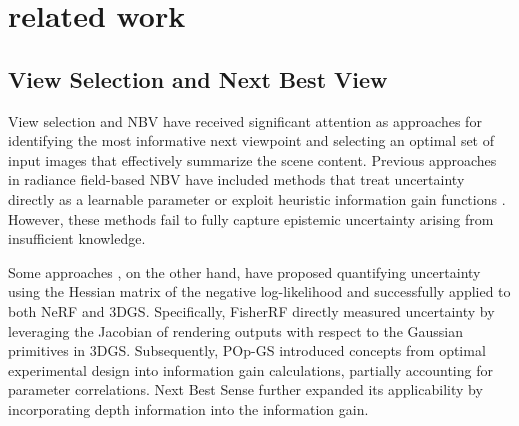 \section{related work}
\label{sec:relatedwork}
\subsection{View Selection and Next Best View}

View selection and \ac{NBV} have received significant attention as approaches for identifying the most informative next viewpoint and selecting an optimal set of input images that effectively summarize the scene content. Previous approaches in radiance field-based \ac{NBV} have included methods that treat uncertainty directly as a learnable parameter \cite{feng2024naruto} or exploit heuristic information gain functions \cite{chen2025activegamer}. However, these methods fail to fully capture epistemic uncertainty arising from insufficient knowledge. 

Some approaches \cite{goli2024bayes, jiang2024fisherrf, wilson2025pop, strong2024next}, on the other hand, have proposed quantifying uncertainty using the Hessian matrix of the negative log-likelihood and successfully applied to both \ac{NeRF} and \ac{3DGS}. Specifically, FisherRF \cite{jiang2024fisherrf} directly measured uncertainty by leveraging the Jacobian of rendering outputs with respect to the Gaussian primitives in \ac{3DGS}. Subsequently, POp-GS \cite{wilson2025pop} introduced concepts from optimal experimental design \cite{kiefer1974general} into information gain calculations, partially accounting for parameter correlations. Next Best Sense \cite{strong2024next} further expanded its applicability by incorporating depth information into the information gain.


